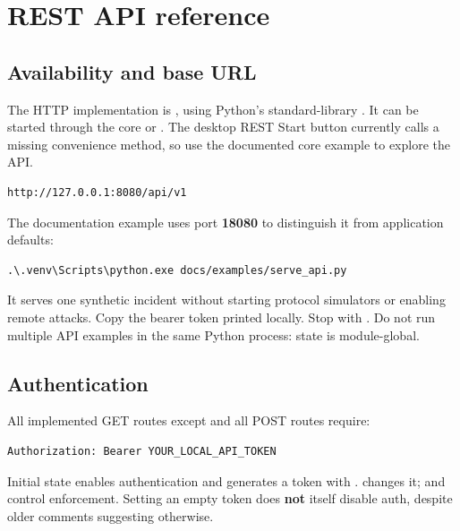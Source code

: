 \chapter{REST API reference}\label{chapter-8}
\section*{Availability and base URL}
The HTTP implementation is , using Python's standard-library . It can be started through the core  or . The desktop REST Start button currently calls a missing convenience method, so use the documented core example to explore the API.

\par\noindent\begin{minipage}{\linewidth}
\begin{lstlisting}[title={TEXT}]
http://127.0.0.1:8080/api/v1
\end{lstlisting}
\end{minipage}\par
\par\noindent\begin{minipage}{\linewidth}
The documentation example uses port \textbf{18080} to distinguish it from application defaults:
\begin{lstlisting}[title={POWERSHELL}]
.\.venv\Scripts\python.exe docs/examples/serve_api.py
\end{lstlisting}
\end{minipage}\par
It serves one synthetic incident without starting protocol simulators or enabling remote attacks. Copy the bearer token printed locally. Stop with . Do not run multiple API examples in the same Python process: state is module-global.

\section*{Authentication}
\par\noindent\begin{minipage}{\linewidth}
All implemented GET routes except  and all POST routes require:
\begin{lstlisting}[title={HTTP}]
Authorization: Bearer YOUR_LOCAL_API_TOKEN
\end{lstlisting}
\end{minipage}\par
Initial state enables authentication and generates a token with .  changes it;  and  control enforcement. Setting an empty token does \textbf{not} itself disable auth, despite older comments suggesting otherwise.

